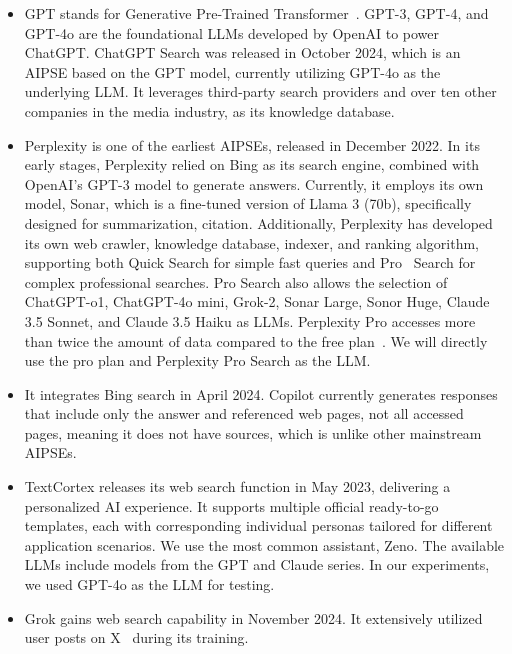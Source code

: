 \begin{itemize}[leftmargin=*]
    \item {} GPT stands for Generative Pre-Trained Transformer~\cite{transformer}.
    GPT-3, GPT-4, and GPT-4o are the foundational LLMs developed by OpenAI to power ChatGPT. 
    ChatGPT Search was released in October 2024, which is an AIPSE based on the GPT model, currently utilizing GPT-4o as the underlying LLM. 
    It leverages third-party search providers and over ten other companies in the media industry, as its knowledge database.
    \item {}
    Perplexity is one of the earliest AIPSEs, released in December 2022.
    In its early stages, Perplexity relied on Bing as its search engine, combined with OpenAI's GPT-3 model to generate answers. 
    Currently, it employs its own model, Sonar, which is a fine-tuned version of Llama 3 (70b), specifically designed for summarization, citation.
    Additionally, Perplexity has developed its own web crawler, knowledge database, indexer, and ranking algorithm, supporting both Quick Search for simple fast queries and Pro~\cite{whypro} Search for complex professional searches.
    Pro Search also allows the selection of ChatGPT-o1,  ChatGPT-4o mini, Grok-2, Sonar Large, Sonor Huge,  Claude 3.5 Sonnet, and Claude 3.5 Haiku as LLMs.
    Perplexity Pro accesses more than twice the amount of data compared to the free plan~\cite{whypro}.
    We will directly use the pro plan and Perplexity Pro Search as the LLM.
    \item {} It integrates Bing search in April 2024. Copilot currently generates responses that include only the answer and referenced web pages, not all accessed pages, meaning it does not have sources, which is unlike other mainstream AIPSEs.
    \item {} TextCortex releases its web search function in May 2023, delivering a personalized AI experience.
    It supports multiple official ready-to-go templates, each with corresponding individual personas tailored for different application scenarios.
    We use the most common assistant, Zeno. The available LLMs include models from the GPT and Claude series. In our experiments, we used GPT-4o as the LLM for testing.
    \item {} Grok gains web search capability in November 2024.
    It extensively utilized user posts on X~\cite{x} during its training.

\end{itemize}

